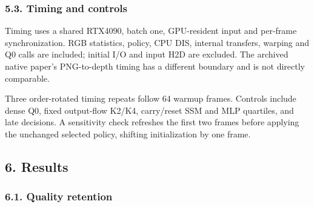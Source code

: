 \documentclass[
  10pt,
]{article}
\begin{document}
\subsubsection{5.3. Timing and controls}\label{timing-and-controls}

Timing uses a shared RTX4090, batch one, GPU-resident input and
per-frame synchronization. RGB statistics, policy, CPU DIS, internal
transfers, warping and Q0 calls are included; initial I/O and input H2D
are excluded. The archived native paper's PNG-to-depth timing has a
different boundary and is not directly comparable.

Three order-rotated timing repeats follow 64 warmup frames. Controls
include dense Q0, fixed output-flow K2/K4, carry/reset SSM and MLP
quartiles, and late decisions. A sensitivity check refreshes the first
two frames before applying the unchanged selected policy, shifting
initialization by one frame.

\subsection{6. Results}\label{results}

\subsubsection{6.1. Quality retention}\label{quality-retention}
\end{document}

